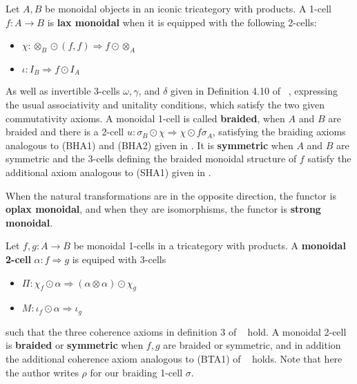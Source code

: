 \begin{defn}
Let $A,B$ be monoidal objects in an iconic tricategory  with products. A 1-cell $f:A \rightarrow B$ is {\bf lax monoidal} when it is equipped with the following 2-cells:
\begin{itemize}
\item $\chi: \otimes_B \odot (f,f) \Rightarrow f \odot \otimes_A$
\item $\iota: I_B \Rightarrow f \odot I_A$
\end{itemize}
As well as invertible 3-cells $\omega, \gamma$, and $\delta$ given in Definition 4.10 of ~\cite{nick:tricatsbook}, expressing the usual associativity and unitality conditions, which satisfy the two given commutativity axioms.
A monoidal 1-cell is called {\bf braided}, when $A$ and $B$ are braided and there is a 2-cell $u: \sigma_B \odot \chi  \Rightarrow \chi \odot f\sigma_A$, satisfying the braiding axioms analogous to (BHA1) and (BHA2) given in  \cite[p141-142]{mccrudden:bal-coalgb}. It is {\bf symmetric} when $A$ and $B$ are symmetric and the 3-cells defining the braided monoidal structure of $f$ satisfy the additional axiom analogous to  (SHA1) given in   \cite[p145]{mccrudden:bal-coalgb}.

When the natural transformations are in the opposite direction, the functor is {\bf oplax monoidal}, and when they are isomorphisms, the functor is {\bf strong monoidal}.
\end{defn}



\begin{defn}\label{Def:monverttrans}
Let $f, g:A \rightarrow B$ be monoidal 1-cells in a tricategory with products. A {\bf monoidal 2-cell} $\alpha: f \Rightarrow g$ is equiped with 3-cells
\begin{itemize}
\item $\Pi: \chi_f \odot \alpha \Rightarrow (\alpha \otimes \alpha) \odot \chi_g$
\item $M: \iota_f \odot \alpha \Rightarrow \iota_g$
\end{itemize}
such that the three coherence axioms in definition 3 of ~\cite{gg:ldstr-tricat} hold.
A monoidal 2-cell is {\bf braided} or {\bf symmetric} when $f,g$ are braided or symmetric, and in addition the additional coherence axiom analogous to (BTA1) of ~\cite[p143]{mccrudden:bal-coalgb} holds. Note that here the author writes $\rho$ for our braiding 1-cell $\sigma$.
\end{defn}


